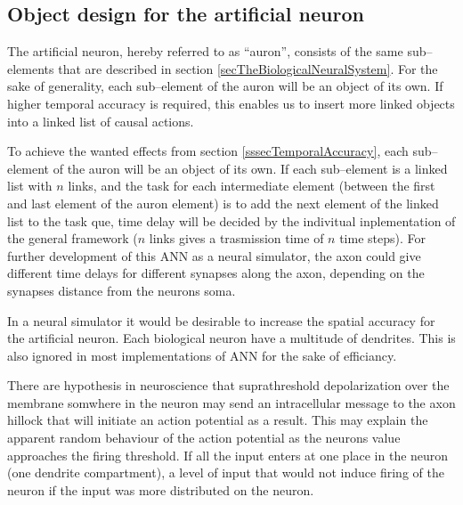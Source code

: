 
	\subsection{Object design for the artificial neuron} 								%
	The artificial neuron, hereby referred to as ``auron'', consists of the same sub--elements that are described in section \ref{secTheBiologicalNeuralSystem}.
	For the sake of generality, each sub--element of the auron will be an object of its own. If higher temporal accuracy is required, this enables us to insert more linked objects into a linked list of causal actions. %

	To achieve the wanted effects from section \ref{sssecTemporalAccuracy}, each sub--element of the auron will be an object of its own. 			  %
	If each sub--element is a linked list with $n$ links, and the task for each intermediate element (between the first and last element of the auron element) is to add the next element of the linked list to the task que, 
		time delay will be decided by the indivitual inplementation of the general framework ($n$ links gives a trasmission time of $n$ time steps).
	For further development of this ANN as a neural simulator, the axon could give different time delays for different synapses along the axon, depending on the synapses distance from the neurons soma.

	In a neural simulator it would be desirable to increase the spatial accuracy for the artificial neuron. 
	Each biological neuron have a multitude of dendrites. This is also ignored in most implementations of ANN for the sake of efficiancy.

	There are hypothesis in neuroscience that suprathreshold depolarization over the membrane somwhere in the neuron may send an intracellular message to the axon hillock that will initiate an action potential as a result.
	This may explain the apparent random behaviour of the action potential as the neurons value approaches the firing threshold. %
	If all the input enters at one place in the neuron (one dendrite compartment), a level of input that would not induce firing of the neuron if the input was more distributed on the neuron.
		
